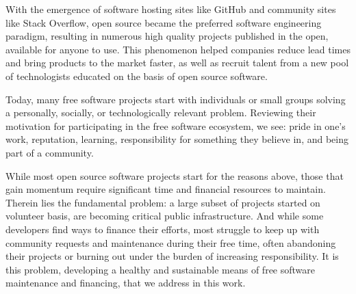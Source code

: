 With the emergence of software hosting sites like GitHub and community sites
like Stack Overflow, open source became the preferred software engineering
paradigm, resulting in numerous high quality projects published in the open,
available for anyone to use. This phenomenon helped
companies reduce lead times and bring products to the market faster, as well as
recruit talent from a new pool of technologists educated on the basis of
open source software.

Today, many free software projects start with individuals or small groups
solving a personally, socially, or technologically relevant problem.
Reviewing their motivation for participating in the free software ecosystem,
we see: pride in one's work, reputation, learning,
responsibility for something they believe in, and being part of a community.

While most open source software projects start for the reasons above, those
that gain momentum require significant time and financial resources to
maintain. Therein lies the fundamental problem: a large subset of projects
started on volunteer basis, are becoming critical public
infrastructure. And while some developers find ways to finance their efforts,
most struggle to keep up with community requests and maintenance during their
free time, often abandoning their projects or burning out under the burden of
increasing responsibility. It is this problem, developing a healthy and
sustainable means of free software maintenance and financing, that we address
in this work.
